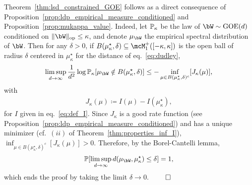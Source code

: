 {Theorem~\ref{thm:lsd_constrained_GOE} follows as a direct consequence of Proposition~\ref{prop:ldp_empirical_measure_conditioned} and Proposition~\ref{prop:mukappa_value}.
Indeed, let $\mathbb{P}_\kappa$ be the law of $\bW \sim \GOE(d)$ conditioned on $\|\bW\|_\op \leq \kappa$, and denote $\mu_\bW$ the empirical spectral distribution of $\bW$.
Then for any $\delta > 0$, if $B(\mu_\kappa^\star,\delta) \subseteq \mcM_1^+([-\kappa,\kappa])$ is the open ball of radius $\delta$ centered in $\mu_\kappa^\star$ for the distance of eq.~\eqref{eq:dudley}, 
\begin{align*}
    \limsup_{d \to \infty} \frac{1}{d^2} \log \bbP_\kappa[\mu_\bW \notin B(\mu_\kappa^\star, \delta)] \leq - \inf_{\mu \in B(\mu_\kappa^\star, \delta)^c} [J_\kappa(\mu)],
\end{align*}
with 
\begin{align*}
    J_\kappa(\mu) \coloneqq I(\mu) - I(\mu_\kappa^\star),
\end{align*}
for $I$ given in eq.~\eqref{eq:def_I}.
Since $J_\kappa$ is a good rate function (see Proposition~\ref{prop:ldp_empirical_measure_conditioned}) and has a unique minimizer (cf.\ $(ii)$ of Theorem~\ref{thm:properties_inf_I}), 
$\inf_{\mu \in B(\mu_\kappa^\star, \delta)^c} [J_\kappa(\mu)] > 0$. Therefore, by the Borel-Cantelli lemma,
\begin{align*}
    \bbP[\limsup_{d \to \infty} d(\mu_\bW, \mu_\kappa^\star) \leq \delta] = 1,
\end{align*}
which ends the proof by taking the limit $\delta \to 0$.
$\qed$

}